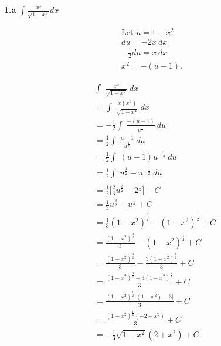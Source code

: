 \documentclass{report}
\begin{document}
    \begin{mdframed}
        \textbf{1.a} $\int \frac{x^{3}}{\sqrt{1-x^{2}}} dx$
    \end{mdframed}
    \bigbreak \noindent 
    \begin{minipage}[t]{0.47\textwidth}
    \begin{align*}
        \text{Let $u=1-x^{2}$} \\
        du = -2x\ dx \\
        -\frac{1}{2}du = x\ dx \\
        x^{2} = -(u-1)
    .\end{align*}
    \end{minipage}
    \begin{minipage}[t]{0.37\textwidth}
    \begin{align*}
        &\int_{}^{}\ \frac{x^{3}}{\sqrt{1-x^{2}}}\ dx \\
        &=\int_{}^{}\ \frac{x(x^{2})}{\sqrt{1-x^{2}}}\ dx \\
        &=-\frac{1}{2}\int_{}^{}\ \frac{-(u-1)}{u^{\frac{1}{2}}}\ du \\
        &=\frac{1}{2}\int_{}^{}\ \frac{u-1}{u^{\frac{1}{2}}}\ du \\
        &=\frac{1}{2}\int_{}^{}\ (u-1)u^{-\frac{1}{2}}\ du \\
        &=\frac{1}{2}\int_{}^{}\ u^{\frac{1}{2}} - u^{-\frac{1}{2}}\ du \\
        &=\frac{1}{2}\bigg[\frac{2}{3}u^{\frac{3}{2}}-2^{\frac{1}{2}}\bigg] + C\\
        &=\frac{1}{3}u^{\frac{3}{2}} + u^{\frac{1}{2}} + C \\
        &= \frac{1}{3}(1-x^{2})^{\frac{3}{2}}-(1-x^{2})^{\frac{1}{2}}+ C \\
        &=\frac{(1-x^{2})^{\frac{3}{2}}}{3}-(1-x^{2})^{\frac{1}{2}} + C \\
        &=\frac{(1-x^{2})^{\frac{3}{2}}}{3} - \frac{3(1-x^{2})^{\frac{1}{2}}}{3} +C\\
        &= \frac{(1-x^{2})^{\frac{3}{2}}-3(1-x^{2})^{\frac{1}{2}}}{3} +C\\
        &= \frac{(1-x^{2})^{\frac{1}{2}}\big[(1-x^{2})-3\big]}{3} +C\\
        &= \frac{(1-x^{2})^{\frac{1}{2}}(-2-x^{2})}{3}+ C \\
        &= -\frac{1}{3}\sqrt{1-x^{2}}(2+x^{2}) + C
    .\end{align*}
    \end{minipage}
\end{document}
